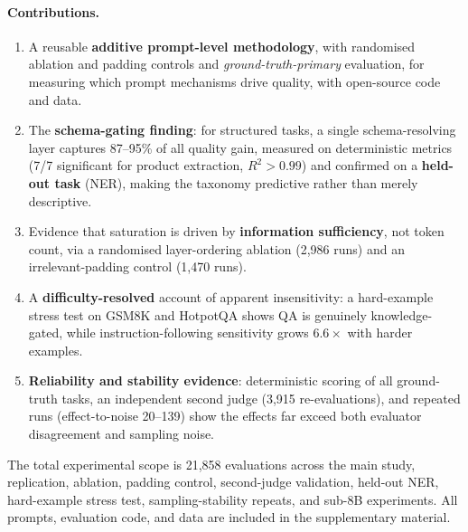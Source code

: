 \paragraph{Contributions.}
\begin{enumerate}
  \item A reusable \textbf{additive prompt-level methodology}, with randomised
    ablation and padding controls and \emph{ground-truth-primary} evaluation,
    for measuring which prompt mechanisms drive quality, with open-source code
    and data.
  \item The \textbf{schema-gating finding}: for structured tasks, a single
    schema-resolving layer captures 87--95\% of all quality gain, measured on
    deterministic metrics (7/7 significant for product extraction,
    $R^2 > 0.99$) and confirmed on a \textbf{held-out task} (NER), making the
    taxonomy predictive rather than merely descriptive.
  \item Evidence that saturation is driven by \textbf{information
    sufficiency}, not token count, via a randomised layer-ordering ablation
    (2,986 runs) and an irrelevant-padding control (1,470 runs).
  \item A \textbf{difficulty-resolved} account of apparent insensitivity: a
    hard-example stress test on GSM8K and HotpotQA shows QA is genuinely
    knowledge-gated, while instruction-following sensitivity grows $6.6\times$
    with harder examples.
  \item \textbf{Reliability and stability evidence}: deterministic scoring of
    all ground-truth tasks, an independent second judge (3,915 re-evaluations),
    and repeated runs (effect-to-noise 20--139) show the effects far exceed
    both evaluator disagreement and sampling noise.
\end{enumerate}

The total experimental scope is 21,858 evaluations across the main study,
replication, ablation, padding control, second-judge validation, held-out NER,
hard-example stress test, sampling-stability repeats, and sub-8B experiments.
All prompts, evaluation code, and data are included in the supplementary
material.
